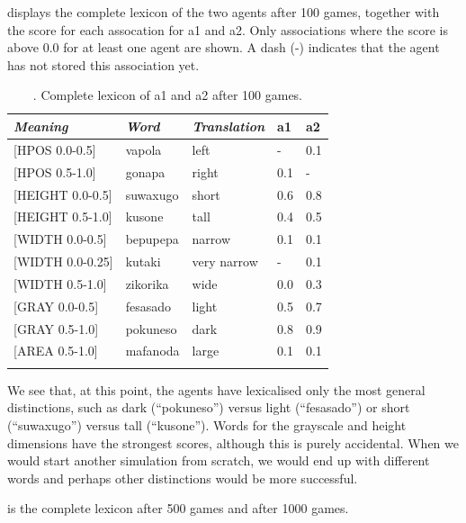  displays the complete lexicon of the two agents after 100 games, 
together with the score for each assocation for 
{\bfshape  a1} and {\bfshape  a2}. Only associations where the 
score is above 0.0 for at least one agent are shown. 
A dash (-) indicates that the agent has not stored 
this association yet. 


\begin{table}
\begin{center}
\begin{tabular}{ l  l  l  l  l }
\lsptoprule
{\itshape Meaning}&{\itshape Word}&{\itshape Translation} & {\bfshape  a1}&{\bfshape  a2} \\ \midrule
{}[HPOS 0.0-0.5] & vapola&left&-&0.1\\ 
{}[HPOS 0.5-1.0]& gonapa&right &0.1&-\\ 
{}[HEIGHT 0.0-0.5]&suwaxugo&short &0.6&0.8\\ 
{}[HEIGHT 0.5-1.0]& kusone&tall &0.4&0.5\\ 
{}[WIDTH 0.0-0.5]&bepupepa&narrow &0.1&0.1\\ 
{}[WIDTH 0.0-0.25]&kutaki&very narrow &-&0.1\\ 
{}[WIDTH 0.5-1.0]& zikorika&wide &0.0&0.3\\ 
{}[GRAY 0.0-0.5]& fesasado&light &0.5&0.7\\ 
{}[GRAY 0.5-1.0]& pokuneso&dark &0.8&0.9\\ 
{}[AREA 0.5-1.0]& mafanoda&large &0.1&0.1\\ 
\lspbottomrule
\end{tabular}
\caption{\label{tab:lex100}. Complete lexicon of {\bfshape  a1} and {\bfshape  a2} after 100 games.}
\end{center}
\end{table}
We see that, at this point, the agents have lexicalised 
only the most general distinctions, such as dark (``pokuneso'') 
versus light (``fesasado'') or short (``suwaxugo'') versus tall 
(``kusone''). Words for the grayscale and height dimensions
have the strongest scores, although this is purely accidental. 
When we would start another simulation from scratch,
we would end up with different words and perhaps 
other distinctions would be more successful. 

 is the complete lexicon after 500 games and  after 1000 games. 


